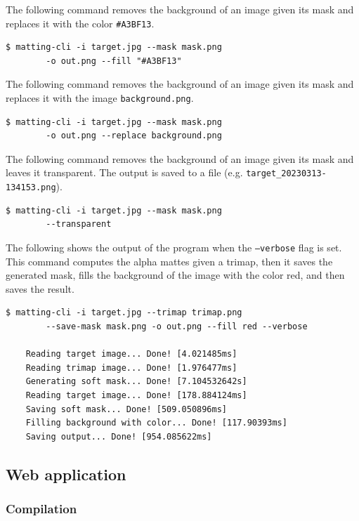 \documentclass[a4paper]{article}
\begin{document}
The following command removes the background of an image
given its mask and replaces it with the color \texttt{\#A3BF13}.
\begin{lstlisting}[style=boxed]
    $ matting-cli -i target.jpg --mask mask.png
        -o out.png --fill "#A3BF13"
\end{lstlisting}

The following command removes the background of an image
given its mask and replaces it with the image \texttt{background.png}.
\begin{lstlisting}[style=boxed]
    $ matting-cli -i target.jpg --mask mask.png
        -o out.png --replace background.png
\end{lstlisting}

The following command removes the background of an image
given its mask and leaves it transparent. The output is saved to a file
(e.g. \texttt{target\_20230313-134153.png}).
\begin{lstlisting}[style=boxed]
    $ matting-cli -i target.jpg --mask mask.png
        --transparent
\end{lstlisting}

The following shows the output of the program when the \texttt{--verbose}
flag is set. This command computes the alpha mattes given a trimap,
then it saves the generated mask, fills the background of the image
with the color red, and then saves the result.
\begin{lstlisting}[style=boxed]
    $ matting-cli -i target.jpg --trimap trimap.png
        --save-mask mask.png -o out.png --fill red --verbose
    
    Reading target image... Done! [4.021485ms]
    Reading trimap image... Done! [1.976477ms]
    Generating soft mask... Done! [7.104532642s]
    Reading target image... Done! [178.884124ms]
    Saving soft mask... Done! [509.050896ms]
    Filling background with color... Done! [117.90393ms]
    Saving output... Done! [954.085622ms]
\end{lstlisting}

\pagebreak

\subsection{Web application}

\subsubsection{Compilation}
\end{document}

